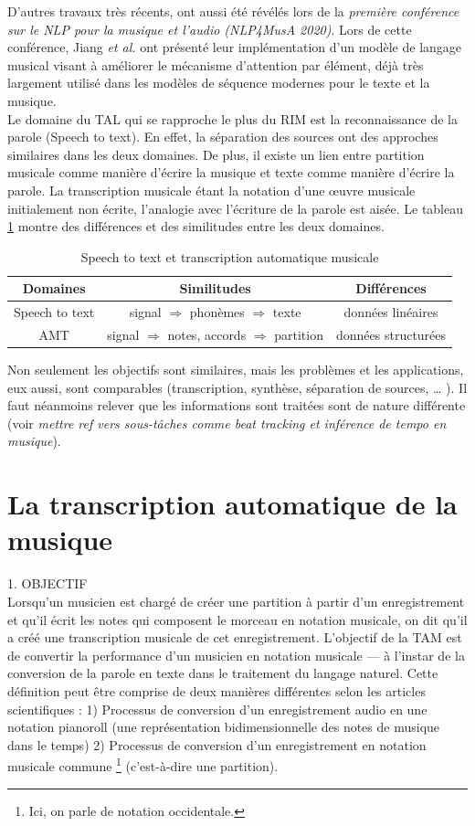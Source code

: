 D’autres travaux
très récents, ont aussi été révélés lors de la \textit{première conférence sur
le NLP pour la musique et l’audio (NLP4MusA 2020)}. Lors de cette conférence,
Jiang \textit{et al.} \cite{Jiang2020DiscoveringMR} ont présenté leur
implémentation d’un modèle de langage musical visant à améliorer le mécanisme
d’attention par élément, déjà très largement utilisé dans les modèles de
séquence modernes pour le texte et la musique.\\
Le domaine du TAL qui se rapproche le plus du RIM est la reconnaissance de la
parole (Speech to text). En effet, la séparation des sources ont des approches
similaires dans les deux domaines. De plus, il existe un lien entre partition
musicale comme manière d’écrire la musique et texte comme manière d’écrire la
parole. La transcription musicale étant la notation d’une œuvre musicale
initialement non écrite, l’analogie avec l’écriture de la parole est aisée. Le
tableau \ref{spToTxt_vs_TAM} montre des différences et des similitudes entre
les deux domaines.

\begin{table}[h]
	\centering
	\begin{tabular}{|c|c|c|} \hline
	Domaines & Similitudes & Différences \\ \hline
	Speech to text & signal $\Rightarrow$ phonèmes $\Rightarrow$
    texte & données linéaires\\
	AMT & signal $\Rightarrow$ notes, accords $\Rightarrow$ partition & données
    structurées\\ \hline
	\end{tabular}
	\caption{Speech to text et transcription automatique musicale}
	\label{spToTxt_vs_TAM}
\end{table}
Non seulement les objectifs sont similaires, mais les problèmes et les
applications, eux aussi, sont comparables (transcription, synthèse, séparation
de sources, … ). Il faut néanmoins relever que les informations sont traitées
sont de nature différente (voir \textit{mettre ref vers sous-tâches comme beat
tracking et inférence de tempo en musique}).

\section{La transcription automatique de la musique}
1. OBJECTIF\\
Lorsqu’un musicien est chargé de créer une partition à partir d’un
enregistrement et qu’il écrit les notes qui composent le morceau en notation
musicale, on dit qu’il a créé une transcription musicale de cet enregistrement.
L’objectif de la TAM \cite{future_directions} est de convertir la performance
d’un musicien en notation musicale — à l’instar de la conversion de la parole
en texte dans le traitement du langage naturel. Cette définition peut être
comprise de deux manières différentes selon les articles scientifiques :
1) Processus de conversion d’un enregistrement audio en une notation pianoroll
(une représentation bidimensionnelle des notes de musique dans le temps)
2) Processus de conversion d’un enregistrement en notation musicale commune
\footnote{Ici, on parle de notation occidentale.} (c’est-à-dire une
partition).\\

